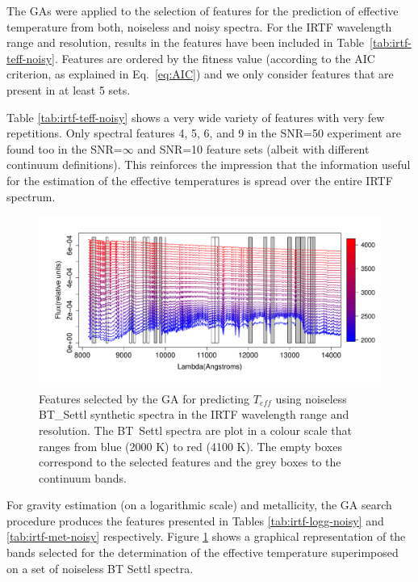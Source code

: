 The GAs were applied to the selection of features for the prediction
of effective temperature from both, noiseless and noisy spectra.  For
the IRTF wavelength range and resolution, results in the features have
been included in Table~\ref{tab:irtf-teff-noisy}. Features are ordered
by the fitness value (according to the AIC criterion, as explained in
Eq.~\ref{eq:AIC}) and we only consider features that are present in at
least 5 sets.

Table \ref{tab:irtf-teff-noisy} shows a very wide variety of features
with very few repetitions. Only spectral features 4, 5, 6, and 9 in
the SNR=50 experiment are found too in the SNR=$\infty$ and SNR=10
feature sets (albeit with different continuum definitions). This
reinforces the impression that the information useful for the
estimation of the effective temperatures is spread over the entire
IRTF spectrum.

\begin{figure}
\includegraphics[width=\textwidth]{figs/BT-spectraAtIRTF-Inf-teff2}
 \caption{Features selected by the GA for predicting $T_{eff}$ using
    noiseless BT\_Settl synthetic spectra in the IRTF wavelength range
    and resolution. The BT\ Settl spectra are plot in a colour scale
    that ranges from blue (2000 K) to red (4100 K). The empty boxes
    correspond to the selected features and the grey boxes to the
    continuum bands.}  \label{fig:IRTF-teff}
\end{figure}

For gravity estimation (on a logarithmic scale) and metallicity,
the GA search procedure produces the features presented in Tables
\ref{tab:irtf-logg-noisy} and \ref{tab:irtf-met-noisy}
respectively. Figure \ref{fig:IRTF-teff} shows a graphical
representation of the bands selected for the determination of the
effective temperature superimposed on a set of noiseless BT Settl
spectra.


